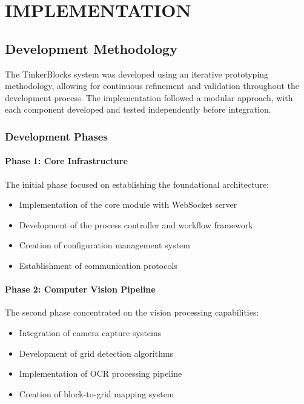 \chapter{IMPLEMENTATION}

\section{Development Methodology}

The TinkerBlocks system was developed using an iterative prototyping methodology, allowing for continuous refinement and validation throughout the development process. The implementation followed a modular approach, with each component developed and tested independently before integration.

\subsection{Development Phases}

\subsubsection{Phase 1: Core Infrastructure}
The initial phase focused on establishing the foundational architecture:
\begin{itemize}
    \item Implementation of the core module with WebSocket server
    \item Development of the process controller and workflow framework
    \item Creation of configuration management system
    \item Establishment of communication protocols
\end{itemize}

\subsubsection{Phase 2: Computer Vision Pipeline}
The second phase concentrated on the vision processing capabilities:
\begin{itemize}
    \item Integration of camera capture systems
    \item Development of grid detection algorithms
    \item Implementation of OCR processing pipeline
    \item Creation of block-to-grid mapping system
\end{itemize}

